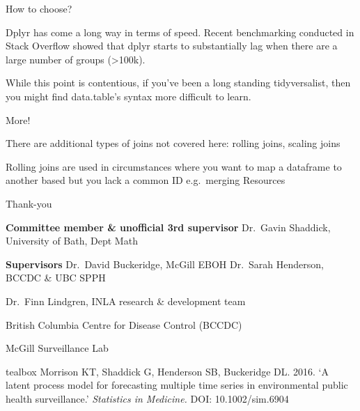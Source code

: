 \documentclass[ignorenonframetext,]{beamer}
\begin{document}
\begin{frame}{How to choose?}

Dplyr has come a long way in terms of speed. Recent benchmarking
conducted in Stack Overflow showed that dplyr starts to substantially
lag when there are a large number of groups (\textgreater{}100k).

While this point is contentious, if you've been a long standing
tidyversalist, then you might find data.table's syntax more difficult to
learn.

\end{frame}

\begin{frame}{More!}

There are additional types of joins not covered here: rolling joins,
scaling joins

Rolling joins are used in circumstances where you want to map a
dataframe to another based but you lack a common ID e.g.~merging
Resources

\end{frame}

\begin{frame}{Thank-you}

\small
\textbf{Committee member \& unofficial 3rd supervisor} \newline
Dr.~Gavin Shaddick, University of Bath, Dept Math

\vspace{2mm} \textbf{Supervisors} \newline
Dr.~David Buckeridge, McGill EBOH \newline
Dr.~Sarah Henderson, BCCDC \& UBC SPPH

\vspace{2mm}

Dr.~Finn Lindgren, INLA research \& development team

\vspace{2mm}

British Columbia Centre for Disease Control (BCCDC)

\vspace{2mm}

McGill Surveillance Lab

\vspace{5mm}


\begin{beamercolorbox}[sep=1mm]{tealbox}
\footnotesize
Morrison KT, Shaddick G, Henderson SB, Buckeridge DL. 2016. `A latent process model for forecasting multiple time series in environmental public health surveillance.' \emph{Statistics in Medicine.} DOI: 10.1002/sim.6904
\end{beamercolorbox}

\end{frame}
\end{document}
